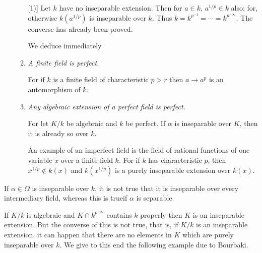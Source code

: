 \begin{enumerate}[1)]
\begin{enumerate} [1)]
Let $k$ have no inseparable extension. Then for $a \in k$, $a^{ 1/ p}
\in k$ also; for, otherwise $k(a^{1/p})$ is inseparable over
$k$. Thus $ k =  k^{ p^{-1}} =  \cdots = k^{ p^{-\infty }}$. The
converse has already been proved.  

We deduce immediately 

\item \textit{ A finite field is perfect. } 

For if $k$ is a finite field of characteristic $p > r$ then $a \to
a^p$ is an automorphism of $k$.  

\item \textit{ Any algebraic extension of a perfect field is perfect.} 

For let $K/k$ be algebraic and $k$ be perfect. If $\alpha$ is
inseparable over $K$, then it is already so over $k$.  

An example of an imperfect field is the field of rational functions of
one variable $x$ over a finite field $k$. For if $k$ has characteristic
$p$, then $x^{ 1/p} \not\in k(x)$ and $k(x^{1/p})$ is a purely inseparable
extension over $k(x)$.  
\end{enumerate}
\end{enumerate}

\medskip
{}
If $\alpha \in \Omega$ is inseparable over $k$, it is not true that it
is inseparable over every intermediary field, whereas this is
true\pageoriginale if $\alpha$ is separable.    

\medskip
{}
If $K/k$ is algebraic and $K \cap k^{ p^{-\infty }}$ contains $k$
properly then $K$ is an inseparable extension. But the converse of
this is not true, that is, if $K/k$ is an inseparable extension, it
can happen that there are no elements in $K$ which are purely
inseparable over $k$. We give to this end the following example due to
Bourbaki.  

